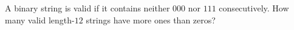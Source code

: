 A binary string is valid if it contains neither $000$ nor $111$ consecutively. How many valid length-$12$ strings have more ones than zeros?
